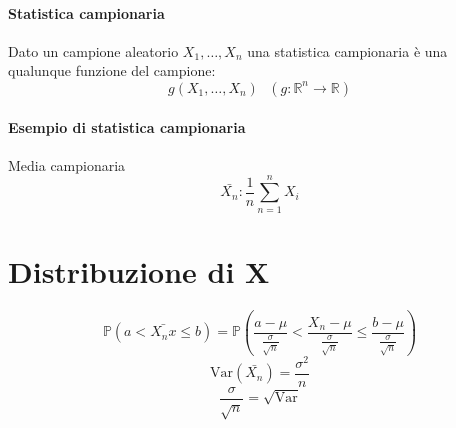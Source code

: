 \documentclass[12pt, a4paper, openany]{book}
\begin{document}
\paragraph*{Statistica campionaria} Dato un campione aleatorio $X_1, \dots, X_n$ una statistica campionaria
è una qualunque funzione del campione:
\begin{equation*}
    g(X_1, \dots, X_n) \text{   } (g:\mathbb{R}^n\rightarrow\mathbb{R})
\end{equation*}

\paragraph*{Esempio di statistica campionaria} Media campionaria
\begin{equation*}
    \bar{X_n}:\frac{1}{n}\sum_{n=1}^n X_i
\end{equation*}
\section{Distribuzione di X}
\begin{equation*}
    \mathbb{P} (a  < \bar{X_nx} \leq b) = \mathbb{P} (\frac{a - \mu}{\frac{\sigma}{\sqrt{n}}} 
    < \frac{X_n - \mu}{\frac{\sigma}{\sqrt{n}}} \leq \frac{b - \mu}{\frac{\sigma}{\sqrt{n}}})   
\end{equation*}
\begin{equation*}
    \text{Var}(\bar{X_n}) = \frac{\sigma ^ 2}{n} 
\end{equation*}
\begin{equation*}
    \frac{\sigma}{\sqrt{n}} = \sqrt{\text{Var}}
\end{equation*}

\end{document}
